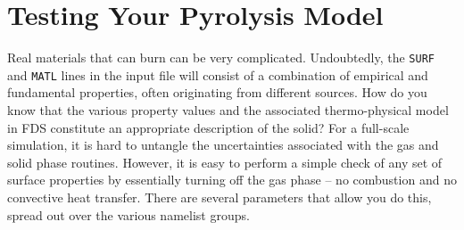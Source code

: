 \documentclass[11pt]{book}
\newcommand{\ct}{\tt\small}
\begin{document}
\clearpage

\section{Testing Your Pyrolysis Model}
\label{solid_phase_verification}

Real materials that can burn can be very complicated. Undoubtedly, the {\ct SURF} and {\ct MATL} lines in the
input file will consist of a combination of empirical and fundamental properties, often originating from different sources. How do you know
that the various property values and the associated thermo-physical model in FDS
constitute an appropriate description of the solid? For a full-scale simulation, it is hard to untangle the uncertainties associated with the gas and solid
phase routines. However, it is easy to perform a simple check of any set of surface properties by essentially turning off the gas phase -- no combustion and
no convective heat transfer. There are several parameters that allow you do this, spread out over the various namelist groups.
\end{document}
